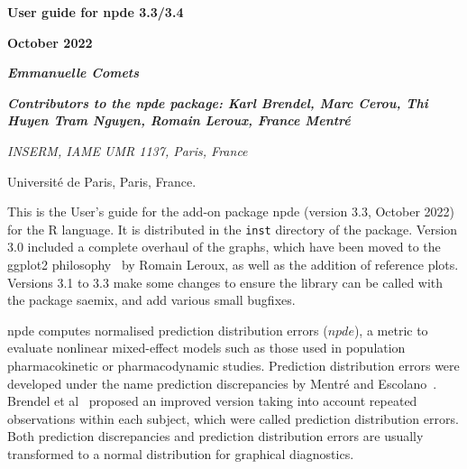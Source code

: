 \documentclass[12pt,a4paper]{article}
\begin{document}

\pagestyle{fancy}
\renewcommand{\headrulewidth}{0pt}
\renewcommand{\footrulewidth}{1pt}
\lhead{}
\chead{}
\rhead{}
\rfoot{\thepage}

\newcommand{\D}{\displaystyle} \normalsize
\renewcommand{\thetable}{\Roman{Contents}}
\renewcommand{\refname}{References}
\renewcommand{\listfigurename}{{\bfseries \sc Legends for figures}}
\renewcommand{\labelitemi}{$\bullet$}

\parindent 18pt
$\phantom{minime}$

\vskip 3cm
\begin{center}
{\setlength{\baselineskip}{2\baselineskip}
{\Large \bfseries User guide for npde 3.3/3.4}

{\Large \bfseries October 2022}

\bigskip 

{\Large \itshape \bfseries Emmanuelle Comets}

{\large \itshape \bfseries Contributors to the npde package: Karl Brendel, Marc Cerou, Thi Huyen Tram Nguyen,  Romain Leroux, France Mentr\'e}

\bigskip
{\it
INSERM, IAME UMR 1137, Paris, France

Universit\'e de Paris, Paris, France.
}
\par}
\end{center}

\vskip 8cm %

\newpage
\tableofcontents
\newpage

\hskip 18pt  This is the User's guide for the add-on package {\sf npde} (version 3.3, October 2022) for the {\sf R} 
language. It is distributed in the \texttt{inst} directory of the package. Version 3.0 included a complete overhaul of 
the graphs, which have been moved to the {\sf ggplot2} philosophy~\cite{ggplot2} by Romain Leroux, as well as the 
addition of reference plots. Versions 3.1 to 3.3 make some changes to ensure the library can be called with the 
package {\sf saemix}, and add various small bugfixes.

{\sf npde} computes normalised prediction distribution errors ($npde$), a metric to evaluate nonlinear mixed-effect models such as those used in population pharmacokinetic or pharmacodynamic studies. Prediction distribution errors were developed under the name prediction discrepancies by Mentr\'e and Escolano~\cite{MentrePDE}. Brendel et al~\cite{Brendel06} proposed an improved version taking into account repeated observations within each subject, which were called prediction distribution errors. Both prediction discrepancies and prediction distribution errors are usually transformed to a normal distribution for graphical diagnostics.
\end{document}
